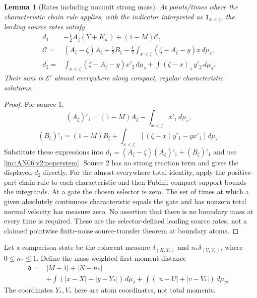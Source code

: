 \documentclass[11pt]{article}
\numberwithin{equation}{section}
\newtheorem{lemma}[theorem]{Lemma}
\theoremstyle{remark}\newtheorem{remark}[theorem]{Remark}
\newcommand{\1}{\mathbf 1}
\begin{document}
\begin{lemma}[Rates including nonunit strong mass]
\label{inc:AN06:v2:generalrates}
At points/times where the characteristic chain rule applies, with the
indicator interpreted as $\1_{x<\zeta}$, the leading source rates satisfy
\begin{align}
 d_1={}&-\tfrac12A_\zeta(Y+K_w)+(1-M)\mathcal C,\nonumber\\
 \mathcal C={}&(A_\zeta-\zeta)A_\zeta+\tfrac12B_\zeta
 -\tfrac12\int_{x<\zeta}(\zeta-A_\zeta-y)x\,d\mu_s,
 \label{inc:AN06:v2:generalrates-eq}\\
 d_2={}&\int_{x<\zeta}(\zeta-A_\zeta-y)x'_2\,d\mu_s
       +\int(\zeta-x)_+y'_2\,d\mu_s.
 \nonumber
\end{align}
Their sum is $\mathcal E'$ almost everywhere along compact, regular
characteristic solutions.
\end{lemma}
\begin{proof}
For source 1,
\[
 (A_\zeta)'_1=(1-M)A_\zeta-\int_{x<\zeta}x'_1\,d\mu_s,
\]
\[
 (B_\zeta)'_1=(1-M)B_\zeta+
 \int_{x<\zeta}[(\zeta-x)y'_1-yx'_1]\,d\mu_s.
\]
Substitute these expressions into
$d_1=(A_\zeta-\zeta)(A_\zeta)'_1+(B_\zeta)'_1$ and use
\eqref{inc:AN06:v2:popsystem}. Source 2 has no strong reaction term and
gives the displayed $d_2$ directly.
For the almost-everywhere total identity, apply the positive-part chain
rule to each characteristic and then Fubini; compact support bounds the
integrands. At a gate the chosen selector is zero. The set of times at
which a given absolutely continuous characteristic equals the gate and
has nonzero total normal velocity has measure zero. No assertion that
there is no boundary mass at every time is required. These are the
selector-defined leading source rates, not a claimed pointwise
finite-noise source-transfer theorem at boundary atoms.
\end{proof}

Let a comparison state be the coherent measure
$\delta_{(X,Y_*)}$ and $n_*\delta_{(U,V_*)}$, where $0\le n_*\le1$.
Define the mass-weighted first-moment distance
\begin{align}
 \mathfrak d={}&|M-1|+|N-n_*|\nonumber\\
 &+\int(|x-X|+|y-Y_*|)\,d\mu_s
 +\int(|u-U|+|v-V_*|)\,d\mu_w.
 \label{inc:AN06:v2:distance}
\end{align}
The coordinates $Y_*,V_*$ here are atom coordinates, not total moments.
\end{document}
